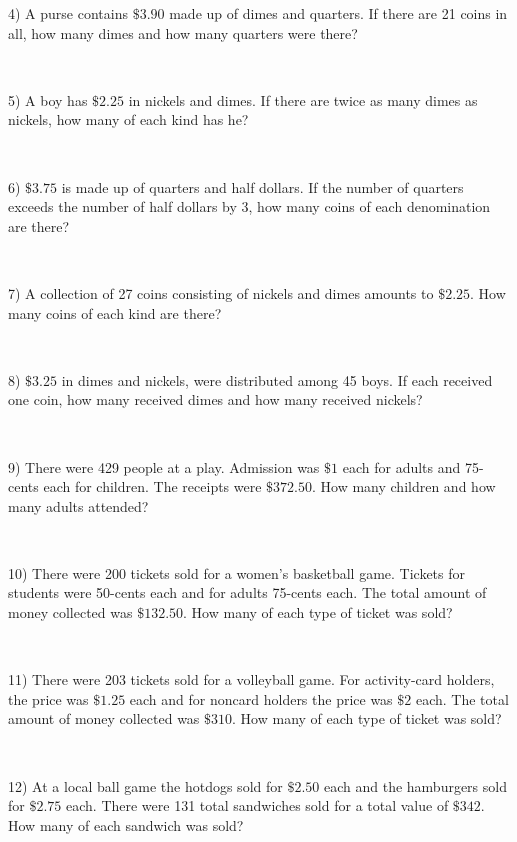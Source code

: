 4) A purse contains $\$3.90$ made up of dimes and quarters. If there
are 21 coins in  all, how many dimes and how many quarters were there?\par
~\par

5) A boy has $\$2.25$ in nickels and dimes. If there are twice as
many dimes as nickels, how many of each kind has he?\par
~\par

6) $\$3.75$ is made up of quarters and half dollars. If the number of
quarters exceeds the number of half dollars by 3,
how many coins of each denomination are there?\par
~\par

7) A collection of 27 coins consisting of nickels and dimes amounts to
$\$2.25$. How many coins of each kind are there?\par
~\par

8) $\$3.25$ in dimes and nickels, were distributed among 45 boys. If
each received one coin, how many received dimes and how many
received nickels?\par
~\par

9) There were 429 people at a play. Admission was $\$1$ each for
adults and 75-cents each for children. The receipts were
$\$372.50$. How many children and how many adults
attended?\par
~\par

10) There were 200 tickets sold for a women's basketball game. Tickets for students were 50-cents each and for adults 75-cents
each. The total amount of  money collected was $\$132.50$.
How many of each type of ticket was sold?\par
~\par

11) There were 203 tickets sold for a volleyball game. For activity-card
holders, the price was $\$1.25$ each and for
noncard holders the price was $\$2$ each. The total
amount of money collected was $\$310$. How many of each type of
ticket was sold?\par
~\par

12) At a local ball game the hotdogs sold for $\$2.50$ each and the
hamburgers sold for $\$2.75$ each. There were 131 total
sandwiches sold for a total value of $\$342$.  How many of
each sandwich was sold?\par
~\par

